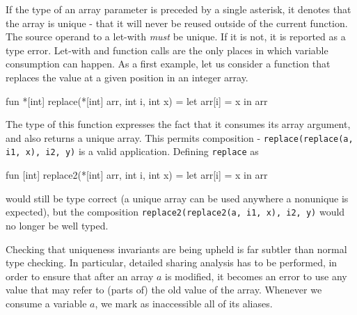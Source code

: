 If the type of an array parameter is preceded by a single asterisk, it
denotes that the array is unique - that it will never be reused
outside of the current function.  The source operand to a let-with
\textit{must} be unique.  If it is not, it is reported as a type
error.  Let-with and function calls are the only places in which
variable consumption can happen.  As a first example, let us consider
a function that replaces the value at a given position in an integer
array.

\begin{colorcode}
  fun *[int] replace(*[int] arr, int i, int x) =
    let arr[i] = x in arr
\end{colorcode}

The type of this function expresses the fact that it consumes its
array argument, and also returns a unique array.  This permits
composition - \texttt{replace(replace(a, i1, x), i2, y)} is a valid
application.  Defining \texttt{replace} as
\begin{colorcode}
  fun [int] replace2(*[int] arr, int i, int x) =
    let arr[i] = x in arr
\end{colorcode}
would still be type correct (a unique array can be used anywhere a
nonunique is expected), but the composition
\texttt{replace2(replace2(a, i1, x), i2, y)} would no longer be well
typed.

Checking that uniqueness invariants are being upheld is far subtler
than normal type checking.  In particular, detailed sharing analysis
has to be performed, in order to ensure that after an array $a$ is
modified, it becomes an error to use any value that may refer to
(parts of) the old value of the array.  Whenever we consume a variable
$a$, we mark as inaccessible all of its aliases.


